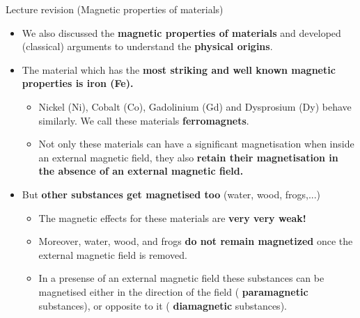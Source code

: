%
%
%

\begin{frame}{Lecture \summarizedlecture revision (Magnetic properties of materials)}

\begin{itemize}

\item We also discussed the {\bf magnetic properties of materials}
          and developed (classical) arguments to understand the {\bf physical origins}.

\item The material which has the {\bf most striking and well known
          magnetic properties is iron (Fe).}

     \begin{itemize}
            \item Nickel (Ni), Cobalt (Co), Gadolinium (Gd) and Dysprosium (Dy) behave similarly.
                      We call these materials {\bf \color{magenta} ferromagnets}.
            \item Not only these materials can have a significant magnetisation when inside an
                      external magnetic field, they also {\bf retain their magnetisation in the absence
                      of an external magnetic field.}
     \end{itemize}

\item But {\bf other substances get magnetised too} (water, wood, frogs,...)

     \begin{itemize}
             \item The magnetic effects for these materials are {\bf very very weak!}
             \item Moreover, water, wood, and frogs {\bf do not remain magnetized} once the external
                       magnetic field is removed.
             \item In a presense of an external magnetic field these substances can be magnetised
                       either in the direction of the field ({\color{magenta} {\bf paramagnetic}} substances),
                       or opposite to it ({\color{magenta} {\bf diamagnetic}} substances).
     \end{itemize}

\end{itemize}

\end{frame}

%
%
%

